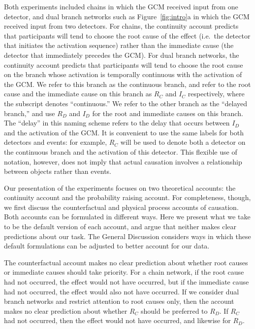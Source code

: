 \documentclass[10pt,letterpaper]{article}
\newcommand{\ev}[2]{$#1_#2$}
\begin{document}
Both experiments included chains in which the GCM received input from one detector, and dual branch networks such as Figure~\ref{fig:intro}a in which the GCM received input from two detectors. For chains, the continuity account predicts that participants will tend to choose the root cause of the effect (i.e.\ the detector that initiates the activation sequence) rather than the immediate cause (the detector that immediately precedes the GCM). For dual branch networks, the continuity account predicts that participants will tend to choose the root cause on the branch whose activation is temporally continuous with the activation of the GCM. We refer to this branch as the continuous branch, and refer to the root cause and the immediate cause on this branch as \ev{R}{C} and \ev{I}{C} respectively, where the subscript denotes ``continuous.'' We refer to the other branch as the ``delayed branch,'' and use \ev{R}{D} and \ev{I}{D} for the root and immediate causes on this branch. The ``delay'' in this naming scheme refers to the delay that occurs between \ev{I}{D} and the activation of the GCM. It is convenient to use the same labels for both detectors and events: for example, \ev{R}{C} will be used to denote both a detector on the continuous branch and the activation of this detector. This flexible use of notation, however, does not imply that actual causation involves a relationship between objects rather than events.

Our presentation of the experiments focuses on two theoretical accounts: the continuity account and the probability raising account. For completeness, though, we first discuss the counterfactual and physical process accounts of causation.  Both accounts can be formulated in different ways. Here we present what we take to be the default version of each account, and argue that neither makes clear predictions about our task. The General Discussion considers ways in which these default formulations can be adjusted to better account for our data.

The counterfactual account makes no clear prediction about whether root causes or immediate causes should take priority. For a chain network, if the root cause had not occurred, the effect would not have occurred, but if the immediate cause had not occurred, the effect would also not have occurred. If we consider dual branch networks and restrict attention to root causes only, then the account makes no clear prediction about whether \ev{R}{C} should be preferred to \ev{R}{D}.  If \ev{R}{C} had not occurred, then the effect would not have occurred, and likewise for \ev{R}{D}.  
\end{document}
